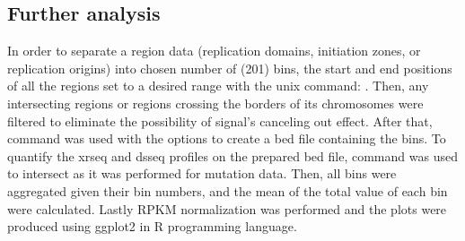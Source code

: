 \subsection{Further analysis}
In order to separate a region data (replication domains, initiation zones, or replication origins) into chosen number of (201) bins, the start and end positions of all the regions set to a desired range with the unix command:   . Then, any intersecting regions or regions crossing the borders of its chromosomes were filtered to eliminate the possibility of signal's canceling out effect. After that,  command was used with the  options to create a bed file containing the bins. To quantify the \gls{xrseq} and \gls{dsseq} profiles on the prepared bed file,  command was used to intersect as it was performed for mutation data. Then, all bins were aggregated given their bin numbers, and the mean of the total value of each bin were calculated. Lastly RPKM normalization was performed and the plots were produced using ggplot2 in R programming language.